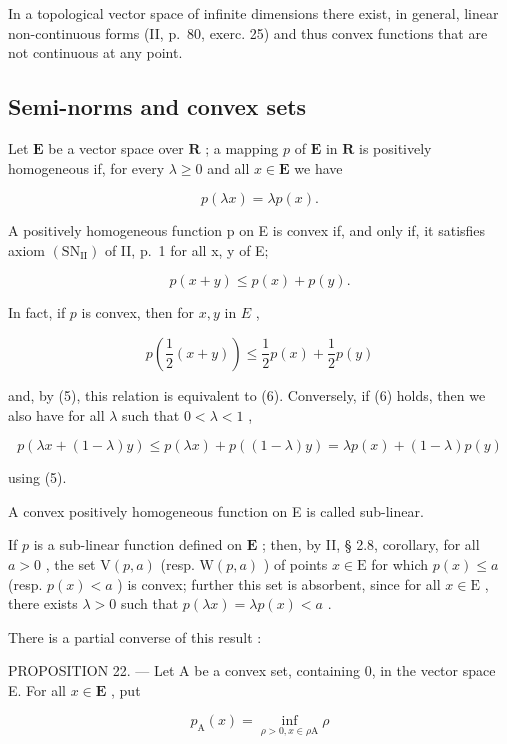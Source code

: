 In a topological vector space of infinite dimensions there exist, in general, linear non-continuous forms (II, p.~80, exerc. 25) and thus convex functions that are not continuous at any point.

\subsection{Semi-norms and convex sets}

Let \(\mathbf{E}\) be a vector space over \(\mathbf{R}\) ; a mapping \(p\) of \(\mathbf{E}\) in \(\mathbf{R}\) is positively homogeneous if, for every \(\lambda \geqslant 0\) and all \(x \in \mathbf{E}\) we have

\[
p (\lambda x) = \lambda p (x).\tag{5}
\]

A positively homogeneous function p on E is convex if, and only if, it satisfies axiom \((\mathrm{SN}_{\mathrm{II}})\) of II, p.~1 for all x, y of E;

\[
p (x + y) \leqslant p (x) + p (y).\tag{6}
\]

In fact, if \(p\) is convex, then for \(x, y\) in \(E\) ,

\[
p \left(\frac {1}{2} (x + y)\right) \leqslant \frac {1}{2} p (x) + \frac {1}{2} p (y)
\]

and, by (5), this relation is equivalent to (6). Conversely, if (6) holds, then we also have for all \(\lambda\) such that \(0 < \lambda < 1\) ,

\[
p (\lambda x + (1 - \lambda) y) \leqslant p (\lambda x) + p ((1 - \lambda) y) = \lambda p (x) + (1 - \lambda) p (y)
\]

using (5).

A convex positively homogeneous function on E is called sub-linear.

If \(p\) is a sub-linear function defined on \(\mathbf{E}\) ; then, by II, § 2.8, corollary, for all \(a > 0\) , the set \(\mathrm{V}(p, a)\) (resp. \(\mathrm{W}(p, a)\) ) of points \(x \in \mathrm{E}\) for which \(p(x) \leqslant a\) (resp. \(p(x) < a\) ) is convex; further this set is absorbent, since for all \(x \in \mathrm{E}\) , there exists \(\lambda > 0\) such that \(p(\lambda x) = \lambda p(x) < a\) .

There is a partial converse of this result :

PROPOSITION 22. --- Let A be a convex set, containing 0, in the vector space E. For all \(x \in \mathbf{E}\) , put

\[
p _ {\mathrm{A}} (x) = \inf _ {\rho > 0, x \in \rho \mathrm{A}} \rho\tag{7}
\]

